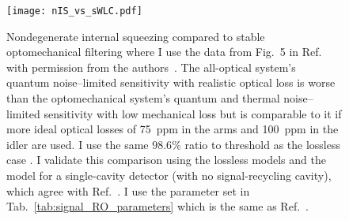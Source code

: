\begin{figure}
	\centering
	\texttt{[image: nIS\_vs\_sWLC.pdf]}
	\caption{ Nondegenerate internal squeezing compared to stable optomechanical filtering where I use the data from Fig.~5 in Ref.~\cite{liBroadbandSensitivityImprovement2020} with permission from the authors~\cite{xiangLiPersonalCommunication}. The all-optical system's quantum noise--limited sensitivity with realistic optical loss is worse than the optomechanical system's quantum and thermal noise--limited sensitivity with low mechanical loss but is comparable to it if more ideal optical losses of 75~ppm in the arms and 100~ppm in the idler are used. I use the same $98.6\%$ ratio to threshold as the lossless case . I validate this comparison using the lossless models and the model for a single-cavity detector (with no signal-recycling cavity), which agree with Ref.~\cite{liBroadbandSensitivityImprovement2020}. I use the parameter set in Tab.~\ref{tab:signal_RO_parameters} which is the same as Ref.~\cite{liBroadbandSensitivityImprovement2020}.}
	\label{fig:nIS_vs_sWLC}
\end{figure}

